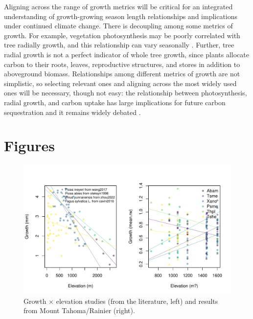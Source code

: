 \documentclass[11pt]{article}
\begin{document}
Aligning across the range of growth metrics will be critical for an integrated understanding of growth-growing season length relationships and implications under continued climate change.  There is decoupling among some metrics of growth. For example, vegetation photosynthesis may be poorly correlated with tree radially growth, and this relationship can vary seasonally \citep{cabon2022cross}. Further, tree radial growth is not a perfect indicator of whole tree growth, since plants allocate carbon to their roots, leaves, reproductive structures, and stores in addition to aboveground biomass. Relationships among different metrics of growth are not simplistic, so selecting relevant ones and aligning across the most widely used ones will be necessary, though not easy: the relationship  between photosynthesis, radial growth, and carbon uptake has large implications for future carbon sequestration and it remains widely debated \citep{green2022limits}.


\newpage
\section{Figures}

\begin{figure}[h!]
\includegraphics[width=1\textwidth]{..//analyses/growthxelevationetc/figures/growthxelev2part.pdf}
\caption{Growth $\times$ elevation studies (from the literature, left) and results from Mount Tahoma/Rainier (right).}
\label{fig:gxelev}
\end{figure}
\end{document}

